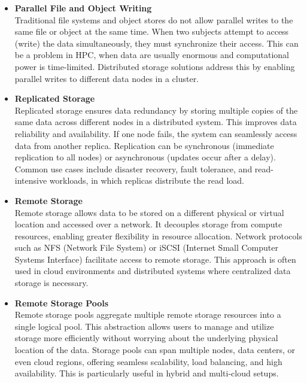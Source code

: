 \begin{itemize}
    \item \textbf{Parallel File and Object Writing} \\
    Traditional file systems and object stores do not allow parallel writes to the same file or object at the same time. When two subjects attempt to access (write) the data simultaneously, they must synchronize their access. This can be a problem in HPC, when data are usually enormous and computational power is time-limited. Distributed storage solutions address this by enabling parallel writes to different data nodes in a cluster. \cite{langr_paralelni_2024}
    \item \textbf{Replicated Storage} \\
    Replicated storage ensures data redundancy by storing multiple copies of the same data across different nodes in a distributed system. This improves data reliability and availability. If one node fails, the system can seamlessly access data from another replica. Replication can be synchronous (immediate replication to all nodes) or asynchronous (updates occur after a delay). Common use cases include disaster recovery, fault tolerance, and read-intensive workloads, in which replicas distribute the read load. \cite{tudelft_225_2023}
    \item \textbf{Remote Storage} \\
    Remote storage allows data to be stored on a different physical or virtual location and accessed over a network. It decouples storage from compute resources, enabling greater flexibility in resource allocation. Network protocols such as NFS (Network File System) or iSCSI (Internet Small Computer Systems Interface) facilitate access to remote storage. This approach is often used in cloud environments and distributed systems where centralized data storage is necessary. \cite{vondra_storage_2022}
    \item \textbf{Remote Storage Pools} \\
    Remote storage pools aggregate multiple remote storage resources into a single logical pool. This abstraction allows users to manage and utilize storage more efficiently without worrying about the underlying physical location of the data. Storage pools can span multiple nodes, data centers, or even cloud regions, offering seamless scalability, load balancing, and high availability. This is particularly useful in hybrid and multi-cloud setups. \cite{vondra_storage_2022}
\end{itemize}

